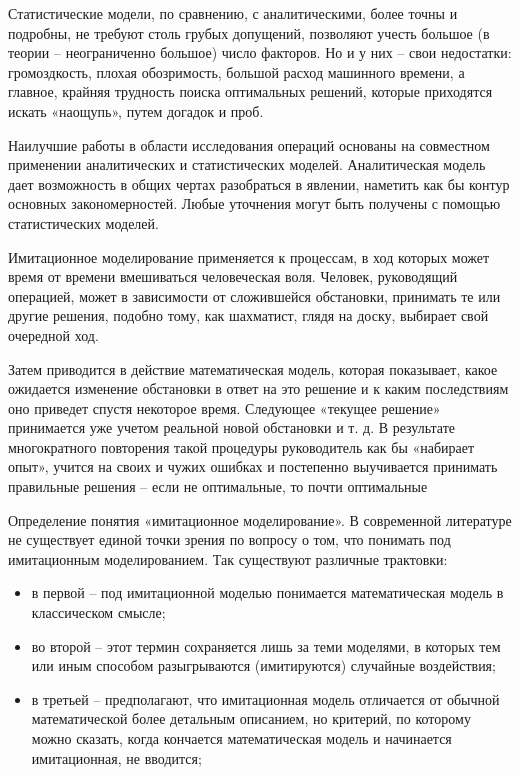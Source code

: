 Статистические модели, по сравнению, с аналитическими, более точны и подробны, не требуют столь грубых допущений, позволяют учесть большое (в теории – неограниченно большое) число факторов. Но и у них – свои недостатки: громоздкость, плохая обозримость, большой расход машинного времени, а главное, крайняя трудность поиска оптимальных решений, которые приходятся искать «наощупь», путем догадок и проб. 

Наилучшие работы в области исследования операций основаны на совместном применении аналитических и статистических моделей. Аналитическая модель дает возможность в общих чертах разобраться в явлении, наметить как бы контур основных закономерностей. Любые уточнения могут быть получены с помощью статистических моделей. 

Имитационное моделирование применяется к процессам, в ход которых может время от времени вмешиваться человеческая воля. Человек, руководящий операцией, может в зависимости от сложившейся обстановки, принимать те или другие решения, подобно тому, как шахматист, глядя на доску, выбирает свой очередной ход. 

Затем приводится в действие математическая модель, которая показывает, какое ожидается изменение обстановки в ответ на это решение и к каким последствиям оно приведет спустя некоторое время. Следующее «текущее решение» принимается уже учетом реальной новой обстановки и т. д. В результате многократного повторения такой процедуры руководитель как бы «набирает опыт», учится на своих и чужих ошибках и постепенно выучивается принимать правильные решения – если не оптимальные, то почти оптимальные

Определение понятия «имитационное моделирование». В современной литературе не существует единой точки зрения по вопросу о том, что понимать под имитационным моделированием. Так существуют различные трактовки: 

\begin{itemize}
    \item в первой – под имитационной моделью понимается математическая модель в классическом смысле;
    \item во второй – этот термин сохраняется лишь за теми моделями, в которых тем или иным способом разыгрываются (имитируются) случайные воздействия;
    \item в третьей – предполагают, что имитационная модель отличается от обычной математической более детальным описанием, но критерий, по которому можно сказать, когда кончается математическая модель и начинается имитационная, не вводится;
\end{itemize}

